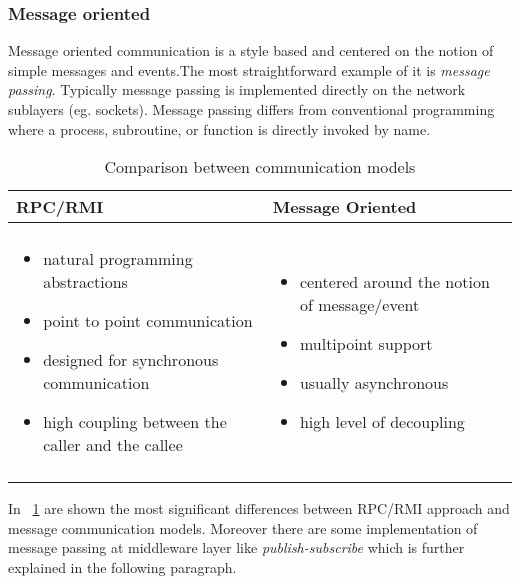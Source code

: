 \subsubsection{Message oriented} \label{messageo} Message oriented communication is a style based and centered on the notion of simple messages and events.The most straightforward example of it is \textit{message passing}. Typically message passing is implemented directly on the network sublayers (eg. sockets). Message passing differs from conventional programming where a process, subroutine, or function is directly invoked by name. 
\begin{table}[h]
	\caption{Comparison between communication models}
	\label{tab:comp}
	\centering
	\begin{tabular}{p{}p{}}
		\toprule
		\textbf{RPC/RMI} & \textbf{Message Oriented} \\
		\midrule
		& \\
	      \begin{minipage}[t]{0.45\textwidth}
	     	\begin{itemize}
	     		\item natural programming abstractions
	     		\item point to point communication
	     		\item designed for synchronous communication
	     		\item high coupling between the caller and the callee
	     	\end{itemize}
	     \end{minipage} &  \begin{minipage}[t]{0.45\textwidth}
	     \begin{itemize}
	     	\item centered around the notion of message/event
	     	\item multipoint support
	     	\item usually asynchronous
	     	\item high level of decoupling
	     \end{itemize}
     \end{minipage} \\
  & \\
		
		\bottomrule
	\end{tabular}
\end{table}
In \tablename~\ref{tab:comp} are shown the most significant differences between RPC/RMI approach and message communication models. Moreover there are some implementation of message passing at middleware layer like \textit{publish-subscribe} which is further explained in the following paragraph.

